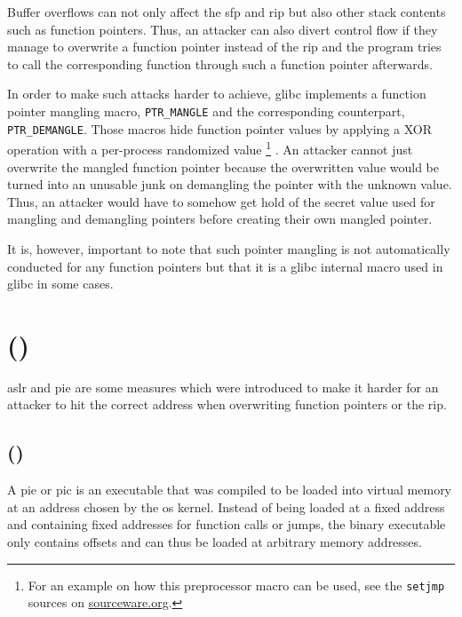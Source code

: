 Buffer overflows can not only affect the \acrfull{sfp} and \acrfull{rip} but also other stack contents such as function pointers.
Thus, an attacker can also divert control flow if they manage to overwrite a function pointer instead of the \gls{rip} and the program tries to call the corresponding function through such a function pointer afterwards.

In order to make such attacks harder to achieve, \gls{glibc} implements a function pointer mangling macro, \texttt{PTR\_MANGLE} and the corresponding counterpart, \texttt{PTR\_DEMANGLE}.
Those macros hide function pointer values by applying a XOR operation with a per-process randomized value%
	\footnote{For an example on how this preprocessor macro can be used, see the \texttt{setjmp} sources on \href{https://sourceware.org/git/?p=glibc.git;a=blob;f=sysdeps/x86_64/setjmp.S;h=b4e05e0f0c1bb2184cf872a6a26eb18de6cfeba1;hb=9ea3686266dca3f004ba874745a4087a89682617}{sourceware.org}.}
\cite{Newton2013}.
An attacker cannot just overwrite the mangled function pointer because the overwritten value would be turned into an unusable junk on demangling the pointer with the unknown value.
Thus, an attacker would have to somehow get hold of the secret value used for mangling and demangling pointers before creating their own mangled pointer.

It is, however, important to note that such pointer mangling is not automatically conducted for any function pointers but that it is a \gls{glibc} internal macro used in \gls{glibc} in some cases.

\section{ ()}
\label{sec:address-space-layout-randomization}

\gls{aslr} and \acrfull{pie} are some measures which were introduced to make it harder for an attacker to hit the correct address when overwriting function pointers or the \gls{rip}.

\subsection{ ()}

A \gls{pie} or \gls{pic} is an executable that was compiled to be loaded into virtual memory at an address chosen by the \gls{os} kernel.
Instead of being loaded at a fixed address and containing fixed addresses for function calls or jumps, the binary executable only contains offsets and can thus be loaded at arbitrary memory addresses.

